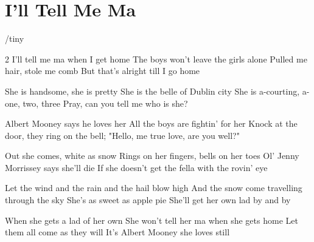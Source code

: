 \documentclass[../../../songbookMain]{subfiles}
\begin{document}
\section{I'll Tell Me Ma}
{/tiny
}

\begin{guitar}
\begin{multicols}{2}
I'll tell me ma when I get home
The boys won't leave the girls alone
Pulled me hair, stole me comb
But that's alright till I go home

She is handsome, she is pretty
She is the belle of Dublin city
She is a-courting, a-one, two, three
Pray, can you tell me who is she?

Albert Mooney says he loves her
All the boys are fightin' for her
Knock at the door, they ring on the bell;
"Hello, me true love, are you well?"

Out she comes, white as snow
Rings on her fingers, bells on her toes
Ol' Jenny Morrissey says she'll die
If she doesn't get the fella with the rovin' eye

Let the wind and the rain and the hail blow high
And the snow come travelling through the sky
She's as sweet as apple pie
She'll get her own lad by and by

When she gets a lad of her own
She won't tell her ma when she gets home
Let them all come as they will
It's Albert Mooney she loves still
\end{multicols}
\end{guitar}
\end{document}
